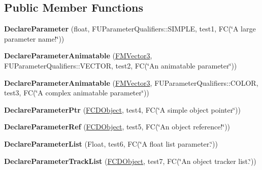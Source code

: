 \subsection*{Public Member Functions}
\begin{DoxyCompactItemize}
\item 
\hypertarget{classFCTestOutsideParameter_ab0eed91383edfae5130acd9b2ef0d432}{
{\bfseries DeclareParameter} (float, FUParameterQualifiers::SIMPLE, test1, FC(\char`\"{}A large parameter name!\char`\"{}))}
\label{classFCTestOutsideParameter_ab0eed91383edfae5130acd9b2ef0d432}

\item 
\hypertarget{classFCTestOutsideParameter_a1c202713beefd038c4fe2610249dd4d9}{
{\bfseries DeclareParameterAnimatable} (\hyperlink{classFMVector3}{FMVector3}, FUParameterQualifiers::VECTOR, test2, FC(\char`\"{}An animatable parameter\char`\"{}))}
\label{classFCTestOutsideParameter_a1c202713beefd038c4fe2610249dd4d9}

\item 
\hypertarget{classFCTestOutsideParameter_aa980952fec6d4224856469a9953debf2}{
{\bfseries DeclareParameterAnimatable} (\hyperlink{classFMVector3}{FMVector3}, FUParameterQualifiers::COLOR, test3, FC(\char`\"{}A complex animatable parameter\char`\"{}))}
\label{classFCTestOutsideParameter_aa980952fec6d4224856469a9953debf2}

\item 
\hypertarget{classFCTestOutsideParameter_a8b731ec2cdbf9c3cb7a75cb8cdb874b7}{
{\bfseries DeclareParameterPtr} (\hyperlink{classFCDObject}{FCDObject}, test4, FC(\char`\"{}A simple object pointer\char`\"{}))}
\label{classFCTestOutsideParameter_a8b731ec2cdbf9c3cb7a75cb8cdb874b7}

\item 
\hypertarget{classFCTestOutsideParameter_a2659ecf92f85babc938701795633e9b8}{
{\bfseries DeclareParameterRef} (\hyperlink{classFCDObject}{FCDObject}, test5, FC(\char`\"{}An object reference!\char`\"{}))}
\label{classFCTestOutsideParameter_a2659ecf92f85babc938701795633e9b8}

\item 
\hypertarget{classFCTestOutsideParameter_a380df0011610957fc342fa5fca86cd71}{
{\bfseries DeclareParameterList} (Float, test6, FC(\char`\"{}A float list parameter.\char`\"{}))}
\label{classFCTestOutsideParameter_a380df0011610957fc342fa5fca86cd71}

\item 
\hypertarget{classFCTestOutsideParameter_aa37dd605266ca285cc21c549d787f7a1}{
{\bfseries DeclareParameterTrackList} (\hyperlink{classFCDObject}{FCDObject}, test7, FC(\char`\"{}An object tracker list.\char`\"{}))}
\label{classFCTestOutsideParameter_aa37dd605266ca285cc21c549d787f7a1}


\end{DoxyCompactItemize}
